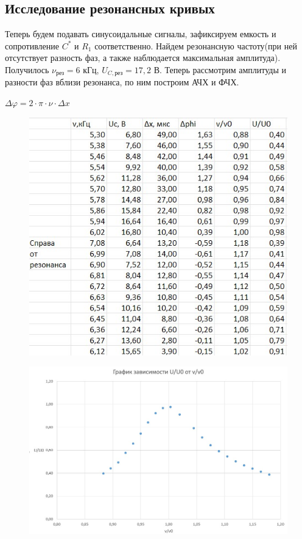 \documentclass[a4paper,12pt]{article}
\begin{document}
\subsection*{Исследование резонансных кривых}
Теперь будем подавать синусоидальные сигналы, зафиксируем емкость и сопротивление $C^\ast$ и $R_1$ соответственно. Найдем резонансную частоту(при ней отсутствует разность фаз, а также наблюдается максимальная амплитуда). Получилось $\nu_{рез} = 6$ кГц, $U_{C, \text{рез}} = 17,2$ В. Теперь рассмотрим амплитуды и разности фаз вблизи резонанса, по ним построим АЧХ и ФЧХ.

$\Delta \varphi = 2 \cdot \pi \cdot \nu \cdot \Delta x$

\begin{figure}[H]
	\begin{center}
    		\includegraphics[width=.5\textwidth]{tabliza2.5.jpg}
    	\end{center}
\end{figure}

\begin{figure}[H]
	\begin{center}    		
    		\includegraphics[width=1\textwidth]{graphik2.5.jpg}
    	\end{center}
\end{figure}
\end{document}
